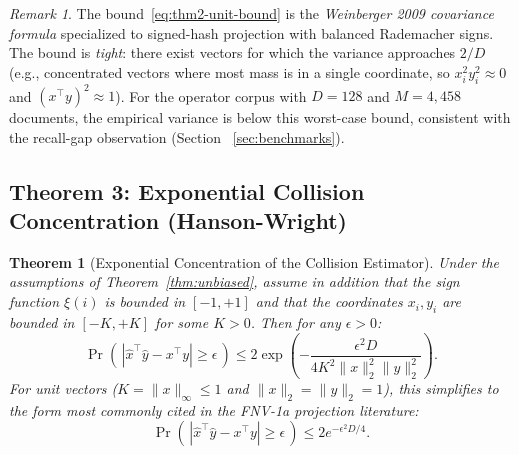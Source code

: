 \documentclass[10pt,twocolumn]{article}
\newtheorem{theorem}{Theorem}
\theoremstyle{definition}
\theoremstyle{remark}
\newtheorem{remark}{Remark}
\begin{document}
\begin{remark}
The bound~\eqref{eq:thm2-unit-bound} is the \emph{Weinberger 2009
covariance formula} specialized to signed-hash projection with balanced
Rademacher signs. The bound is \emph{tight}: there exist vectors for
which the variance approaches $2/D$ (e.g., concentrated vectors where
most mass is in a single coordinate, so $x_i^2 y_i^2 \approx 0$ and
$(x^\top y)^2 \approx 1$). For the operator corpus with $D = 128$ and
$M = 4{,}458$ documents, the empirical variance is below this worst-case
bound, consistent with the recall-gap observation (Section~
\ref{sec:benchmarks}).
\end{remark}

\subsection{Theorem 3: Exponential Collision Concentration (Hanson-Wright)}
\label{thm:concentration}

\begin{theorem}[Exponential Concentration of the Collision Estimator]
\label{thm:concentration-statement}
Under the assumptions of Theorem~\ref{thm:unbiased}, assume in addition
that the sign function $\xi(i)$ is bounded in $[-1, +1]$ and that the
coordinates $x_i, y_i$ are bounded in $[-K, +K]$ for some
$K > 0$. Then for any $\epsilon > 0$:
\begin{equation}
\Pr\!\left(\,|\hat{x}^\top \hat{y} - x^\top y| \ge \epsilon\,\right)
   \le 2 \exp\!\left(-\frac{\epsilon^2 D}{4 K^2 \|x\|_2^2 \|y\|_2^2}\right).
\label{eq:thm3-statement}
\end{equation}
For unit vectors ($K = \|x\|_\infty \le 1$ and $\|x\|_2 = \|y\|_2 = 1$),
this simplifies to the form most commonly cited in the FNV-1a projection
literature:
\begin{equation}
\Pr\!\left(\,|\hat{x}^\top \hat{y} - x^\top y| \ge \epsilon\,\right)
   \le 2 e^{-\epsilon^2 D / 4}.
\label{eq:thm3-unit-bound}
\end{equation}
\end{theorem}
\end{document}
